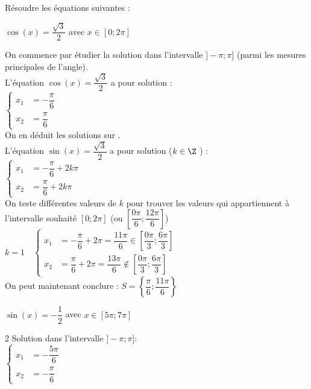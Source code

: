 \documentclass[11pt,a4paper]{article}  %
\begin{document}
Résoudre les équations suivantes : 
\begin{enumMet}
	\item {} $\cos(x)=\dfrac{\sqrt{3}}{2}$ avec $x\in \left[0;2\pi\right]$\\
	\begin{corrBox}
		On commence par étudier la solution dans l'intervalle $]-\pi;\pi]$ (parmi les mesures principales de l'angle).\\
		L'équation $\cos(x)=\dfrac{\sqrt{3}}{2}$ a pour solution :\\
		$\begin{cases}
			x_1 &=-\dfrac{\pi}{6}\\
			x_2 &=\dfrac{\pi}{6}
		\end{cases}$\\
		On en déduit les solutions sur \R.\\
		L'équation $\sin(x)=\dfrac{\sqrt{3}}{2}$ a pour solution ($k\in \Z$ ) :\\
		$\begin{cases}
			x_1 &=-\dfrac{\pi}{6}+2k\pi\\
			x_2 &=\dfrac{\pi}{6}+2k\pi\
		\end{cases}$\\
		On teste différentes valeurs de $k$ pour trouver les valeurs qui appartiennent à l'intervalle souhaité $\left[0;2\pi\right]$ (ou $\left[\dfrac{0\pi}{6};\dfrac{12\pi}{6}\right]$)\\
		$k=1\quad \begin{cases}
			x_1 &=-\dfrac{\pi}{6}+2\pi=\dfrac{11\pi}{6}\in\left[\dfrac{0\pi}{3};\dfrac{6\pi}{3}\right]\\
			x_2 &=\dfrac{\pi}{6}+2\pi=\dfrac{13\pi}{6}\notin\left[\dfrac{0\pi}{3};\dfrac{6\pi}{3}\right]
		\end{cases}$\\
		On peut maintenant conclure : $S=\left\{\dfrac{\pi}{6};\dfrac{11\pi}{6}\right\}$
	\end{corrBox}
	\item $\sin(x)=-\dfrac{1}{2}$ avec $x\in \left[5\pi;7\pi\right]$\\
	\begin{corrBox}
		\begin{multicols}{2}
			Solution dans l'intervalle $]-\pi;\pi]$:\\
			$\begin{cases}
				x_1 &=-\dfrac{5\pi}{6}\\
				x_2 &=-\dfrac{\pi}{6}
			\end{cases}$\\
			

\end{multicols}
\end{corrBox}
\end{enumMet}
\end{document}
